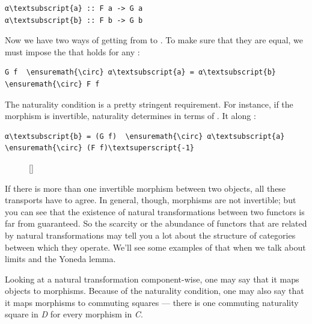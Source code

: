 \begin{Verbatim}[commandchars=\\\{\}]
α\textsubscript{a} :: F a -> G a
α\textsubscript{b} :: F b -> G b
\end{Verbatim}
Now we have two ways of getting from  to . To
make sure that they are equal, we must impose the  that holds for any :

\begin{Verbatim}[commandchars=\\\{\}]
G f  \ensuremath{\circ} α\textsubscript{a} = α\textsubscript{b}  \ensuremath{\circ} F f
\end{Verbatim}
The naturality condition is a pretty stringent requirement. For
instance, if the morphism  is invertible, naturality
determines  in terms of . It 
 along :

\begin{Verbatim}[commandchars=\\\{\}]
α\textsubscript{b} = (G f)  \ensuremath{\circ} α\textsubscript{a}  \ensuremath{\circ} (F f)\textsuperscript{-1}
\end{Verbatim}

\begin{figure}
\raisebox{0pt}[\dimexpr{}\baselineskip\relax]{
}%
\end{figure}

\noindent
If there is more than one invertible morphism between two objects, all
these transports have to agree. In general, though, morphisms are not
invertible; but you can see that the existence of natural
transformations between two functors is far from guaranteed. So the
scarcity or the abundance of functors that are related by natural
transformations may tell you a lot about the structure of categories
between which they operate. We'll see some examples of that when we talk
about limits and the Yoneda lemma.

Looking at a natural transformation component-wise, one may say that it
maps objects to morphisms. Because of the naturality condition, one may
also say that it maps morphisms to commuting squares --- there is one
commuting naturality square in \emph{D} for every morphism in \emph{C}.

